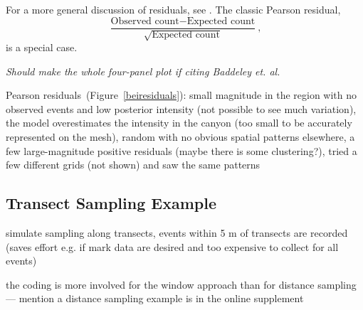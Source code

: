 \documentclass[]{interact}
\begin{document}
For a more general discussion of residuals, see \cite{baddeleyresiduals}. The
classic Pearson residual,
\begin{displaymath}
\frac{\text{Observed count} - \text{Expected count}}
{\sqrt{\text{Expected count}}},
\end{displaymath}
is a special case.

{\it Should make the whole four-panel plot if citing Baddeley et. al.}

Pearson residuals~(Figure~\ref{beiresiduals}): small magnitude in the region
with no observed events and low posterior intensity (not possible to see much
variation), the model overestimates the intensity in the canyon (too small to
be accurately represented on the mesh), random with no obvious spatial patterns
elsewhere, a few large-magnitude positive residuals (maybe there is some
clustering?), tried a few different grids (not shown) and saw the same patterns


\subsection{Transect Sampling Example}
\label{xsectanalysis}

simulate sampling along transects, events within 5 m of transects are recorded
(saves effort e.g. if mark data are desired and too expensive to collect for
all events)

the coding is more involved for the window approach than for distance sampling
--- mention a distance sampling example is in the online supplement
\end{document}

